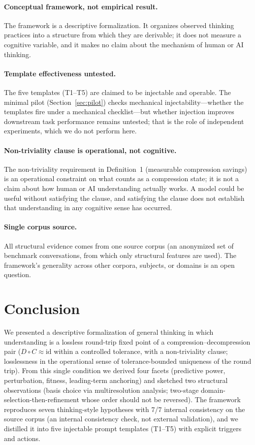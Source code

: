 \documentclass[11pt]{article}
\newcommand{\Cmap}{C}
\newcommand{\Dmap}{D}
\begin{document}
\paragraph{Conceptual framework, not empirical result.}
The framework is a descriptive formalization. It organizes observed thinking
practices into a structure from which they are derivable; it does not measure a
cognitive variable, and it makes no claim about the mechanism of human or AI
thinking.

\paragraph{Template effectiveness untested.}
The five templates (T1--T5) are claimed to be injectable and operable. The
minimal pilot (Section~\ref{sec:pilot}) checks mechanical injectability---whether
the templates fire under a mechanical checklist---but whether injection improves
downstream task performance remains untested; that is the role of independent
experiments, which we do not perform here.

\paragraph{Non-triviality clause is operational, not cognitive.}
The non-triviality requirement in Definition~1 (measurable compression savings)
is an operational constraint on what counts as a compression state; it is not a
claim about how human or AI understanding actually works. A model could be
useful without satisfying the clause, and satisfying the clause does not
establish that understanding in any cognitive sense has occurred.

\paragraph{Single corpus source.}
All structural evidence comes from one source corpus (an anonymized set of
benchmark conversations, from which only structural features are used). The
framework's generality across other corpora, subjects, or domains is an open
question.
\section{Conclusion}
\label{sec:conclusion}

We presented a descriptive formalization of general thinking in which
understanding is a lossless round-trip fixed point of a compression--decompression
pair ($\Dmap\circ\Cmap\approx\mathrm{id}$ within a controlled tolerance, with a
non-triviality clause; losslessness in the operational sense of
tolerance-bounded uniqueness of the round trip). From this single condition we
derived four facets (predictive power, perturbation, fitness, leading-term
anchoring) and sketched two structural observations (basis choice via
multiresolution analysis; two-stage domain-selection-then-refinement whose order
should not be reversed). The framework reproduces seven thinking-style hypotheses
with 7/7 internal consistency on the source corpus (an internal consistency
check, not external validation), and we distilled it into five injectable prompt
templates (T1--T5) with explicit triggers and actions.
\end{document}
